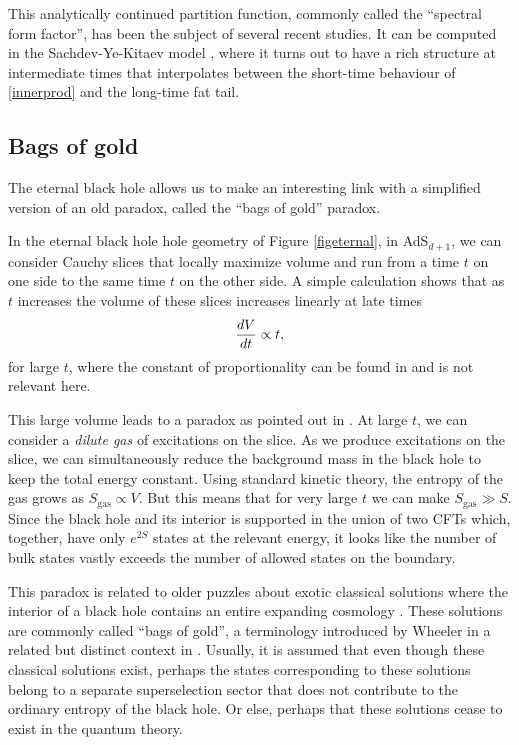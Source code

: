 \documentclass[12pt]{article}
\newcommand{\be}{\begin{equation}}
\newcommand{\ee}{\end{equation}}
\begin{document}
This analytically continued partition function, commonly called the ``spectral form factor'', has been the subject of several recent studies. It can be computed in the Sachdev-Ye-Kitaev model \cite{Cotler:2016fpe,Sonner:2017hxc},  where it turns out to have a rich structure at intermediate times that interpolates between the short-time behaviour of \eqref{innerprod} and the long-time fat tail.


\subsection{Bags of gold}

The eternal black hole allows us to make an interesting link with a simplified version of an old paradox, called the ``bags of gold'' paradox.

In the eternal black hole hole geometry of Figure \ref{figeternal}, in AdS$_{d+1}$, we can consider Cauchy slices that locally maximize volume and run from a time $t$ on one side to the same time $t$ on the other side. A simple calculation  shows that as $t$ increases the volume of these slices increases linearly at late times
\be
{d V \over d t} \propto t,
\ee
for large $t$, where the constant of proportionality can be found in \cite{Hartman:2013qma} and is not relevant here.

This large volume leads to a paradox as pointed out in \cite{Mathur:2014dia}. At large $t$, we can consider a {\em dilute gas} of excitations on the slice.  As we produce excitations on the slice, we can simultaneously reduce the background mass in the black hole to keep the total energy constant. Using standard kinetic theory, the entropy of the gas grows as $S_{\text{gas}} \propto V$. But this means that for very large $t$ we can make $S_{\text{gas}} \gg S$. Since the black hole and its interior is supported in the union of two CFTs which, together, have only $e^{2 S}$ states at the relevant energy, it looks like the number of bulk states vastly exceeds the number of allowed states on the boundary.

This paradox is related to older puzzles about exotic classical solutions where the interior of a black hole contains an entire expanding cosmology \cite{Marolf:2008tx,Hsu:2008yi}. These solutions are commonly called ``bags of gold'', a terminology introduced by  Wheeler in a related but distinct context in \cite{wheeler1964relativity}. Usually, it is assumed that even though these classical solutions exist,  perhaps the states corresponding to these solutions belong to a separate superselection sector that does not contribute to the ordinary entropy of the black hole. Or else, perhaps that these solutions cease to exist in the quantum theory.
\end{document}
